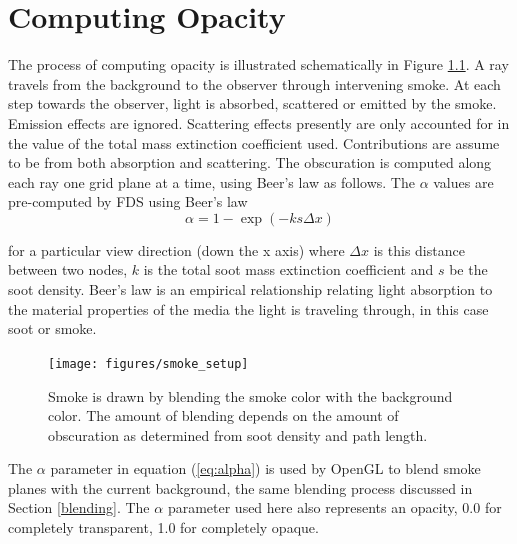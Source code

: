 \documentclass[11pt,twoside]{book}
\newcommand{\figoptions}{htp}
\begin{document}


%
%

\chapter{Computing Opacity}
The process of computing opacity is illustrated schematically in Figure \ref{figsmokesetup}.
A ray travels from the background to the observer through intervening smoke.
At each step towards the observer, light is absorbed, scattered or emitted by the smoke.  Emission effects are ignored.  Scattering effects presently are only accounted for in the value of the total mass extinction coefficient used.  Contributions are assume to be from both absorption and scattering.
The obscuration is computed along each ray one grid plane at a time, using Beer's law as follows.  The $\alpha$ values are pre-computed by FDS using Beer's
law\cite{Siegel:2001}
\begin{equation}
\alpha=1-\exp(-ks\Delta x) \label{eq:alpha}
\end{equation}

\noindent for a particular view direction (down the x axis) where $\Delta x$
is this distance between two nodes, $k$ is the total soot mass
extinction coefficient and $s$ be the soot density. Beer's law is
an empirical relationship relating light absorption to the
material properties of the media the light is traveling through,
in this case soot or smoke.

\begin{figure}[\figoptions]
\begin{center}
\texttt{[image: figures/smoke\_setup]}
\end{center}
\caption {Smoke is drawn by blending the smoke color with the
background color.  The amount of blending depends on the amount of
obscuration as determined from soot density and path length.}
\label{figsmokesetup}
\end{figure}

The $\alpha$ parameter in equation (\ref{eq:alpha}) is used by OpenGL to blend smoke planes with the current background, the same blending process discussed in Section \ref{blending}.  The $\alpha$ parameter used here also represents an opacity, 0.0 for completely transparent, 1.0 for completely opaque.
\end{document}
